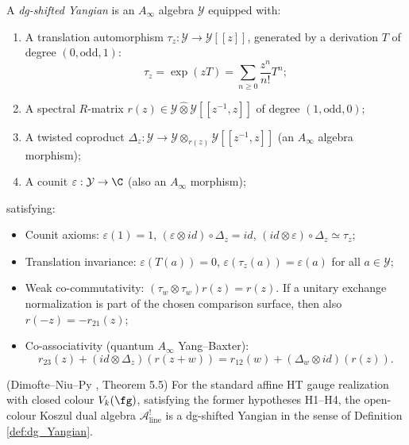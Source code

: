 \begin{definition}
A \emph{dg-shifted Yangian} is an $A_\infty$ algebra $\mathcal{Y}$ equipped with:
\begin{enumerate}[label=(\roman*)]
\item A translation automorphism $\tau_z : \mathcal{Y} \to \mathcal{Y}[[z]]$, generated by a derivation $T$ of degree $(0, \text{odd}, 1)$:
\begin{equation}
\tau_z = \exp(z T) = \sum_{n \geq 0} \frac{z^n}{n!} T^n;
\end{equation}

\item A spectral $R$-matrix $r(z) \in \mathcal{Y} \widehat{\otimes} \mathcal{Y}[[z^{-1}, z]]$ of degree $(1, \text{odd}, 0)$;

\item A twisted coproduct $\Delta_z : \mathcal{Y} \to \mathcal{Y} \otimes_{r(z)} \mathcal{Y}[[z^{-1}, z]]$ (an $A_\infty$ algebra morphism);
\item A counit $\varepsilon : \mathcal{Y} \to \C$ (also an $A_\infty$ morphism);
\end{enumerate}
satisfying:
\begin{itemize}
\item Counit axioms: $\varepsilon(1) = 1$, $(\varepsilon \otimes id) \circ \Delta_z = id$, $(id \otimes \varepsilon) \circ \Delta_z \simeq \tau_z$;
\item Translation invariance: $\varepsilon(T(a)) = 0$, $\varepsilon(\tau_z(a)) = \varepsilon(a)$ for all $a \in \mathcal{Y}$;
\item Weak co-commutativity: $(\tau_w \otimes \tau_w) r(z) = r(z)$.
If a unitary exchange normalization is part of the chosen comparison
surface, then also $r(-z) = -r_{21}(z)$;
\item Co-associativity (quantum $A_\infty$ Yang--Baxter):
\begin{equation}
r_{23}(z) + (id \otimes \Delta_z)(r(z+w)) = r_{12}(w) + (\Delta_w \otimes id)(r(z)).
\end{equation}
\end{itemize}
\end{definition}
\begin{theorem}
(Dimofte--Niu--Py \cite{DNP25}, Theorem 5.5) For the standard affine HT gauge realization with closed colour $V_k(\fg)$, satisfying the former hypotheses H1--H4, the open-colour Koszul dual algebra $\mathcal{A}^!_{\mathrm{line}}$ is a dg-shifted Yangian in the sense of Definition \ref{def:dg_Yangian}.
\end{theorem}

